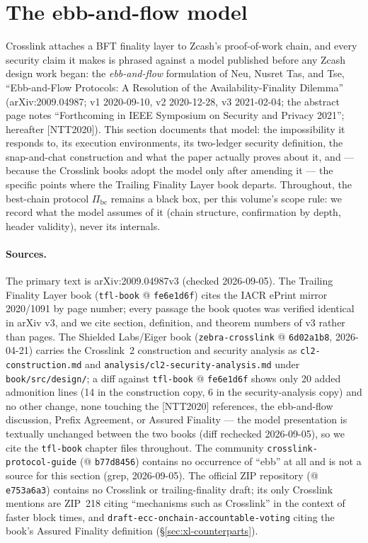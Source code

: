 \documentclass[11pt,a4paper]{article}
\theoremstyle{definition}
\begin{document}
\section{The ebb-and-flow model}\label{sec:xl-model}

Crosslink attaches a BFT finality layer to Zcash's proof-of-work chain, and
every security claim it makes is phrased against a model published before
any Zcash design work began: the \emph{ebb-and-flow} formulation of Neu,
Nusret Tas, and Tse, ``Ebb-and-Flow Protocols: A Resolution of the
Availability-Finality Dilemma'' (arXiv:2009.04987; v1 2020-09-10, v2
2020-12-28, v3 2021-02-04; the abstract page notes ``Forthcoming in IEEE
Symposium on Security and Privacy 2021''; hereafter [NTT2020]). This section
documents that model: the impossibility it responds to, its execution
environments, its two-ledger security definition, the snap-and-chat
construction and what the paper actually proves about it, and --- because
the Crosslink books adopt the model only after amending it --- the specific
points where the Trailing Finality Layer book departs. Throughout, the
best-chain protocol $\Pi_{\mathrm{bc}}$ remains a black box, per this
volume's scope rule: we record what the model assumes of it (chain
structure, confirmation by depth, header validity), never its internals.

\paragraph{Sources.} The primary text is arXiv:2009.04987v3 (checked
2026-09-05). The Trailing Finality Layer book (\texttt{tfl-book} @
\texttt{fe6e1d6f}) cites the IACR ePrint mirror 2020/1091 by page number;
every passage the book quotes was verified identical in arXiv v3, and we
cite section, definition, and theorem numbers of v3 rather than pages.
The Shielded Labs/Eiger book (\texttt{zebra-crosslink} @ \texttt{6d02a1b8},
2026-04-21) carries the Crosslink~2 construction and security analysis as
\texttt{cl2-construction.md} and
\texttt{analysis/cl2-security-analysis.md} under
\texttt{book/src/design/}; a diff against
\texttt{tfl-book} @ \texttt{fe6e1d6f} shows only 20 added admonition
lines (14 in the construction copy, 6 in the security-analysis copy) and
no other change, none touching
the [NTT2020] references, the ebb-and-flow discussion, Prefix Agreement, or
Assured Finality --- the model presentation is textually unchanged between
the two books (diff rechecked 2026-09-05), so we cite the \texttt{tfl-book}
chapter files throughout. The community
\texttt{crosslink-protocol-guide} (@ \texttt{b77d8456}) contains no
occurrence of ``ebb'' at all and is not a source for this section (grep,
2026-09-05). The official ZIP repository (@ \texttt{e753a6a3}) contains no
Crosslink or trailing-finality draft; its only Crosslink mentions are ZIP~218
citing ``mechanisms such as Crosslink'' in the context of faster block
times, and \texttt{draft-ecc-onchain-accountable-voting} citing the
book's Assured Finality definition (\S\ref{sec:xl-counterparts}).
\end{document}
